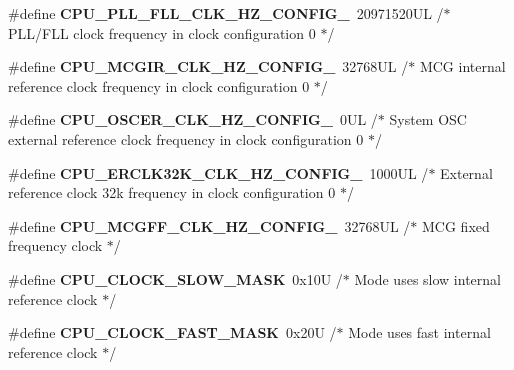 \begin{DoxyCompactItemize}
\item 
\#define {\bfseries C\+P\+U\+\_\+\+P\+L\+L\+\_\+\+F\+L\+L\+\_\+\+C\+L\+K\+\_\+\+H\+Z\+\_\+\+C\+O\+N\+F\+I\+G\+\_}~20971520\+U\+L /$\ast$ P\+L\+L/\+F\+L\+L clock frequency in clock configuration 0 $\ast$/\hypertarget{group___c_p_u___config__module_gad2aaa2918b640ae3833fc84e8f983c3c}{}\label{group___c_p_u___config__module_gad2aaa2918b640ae3833fc84e8f983c3c}

\item 
\#define {\bfseries C\+P\+U\+\_\+\+M\+C\+G\+I\+R\+\_\+\+C\+L\+K\+\_\+\+H\+Z\+\_\+\+C\+O\+N\+F\+I\+G\+\_}~32768\+U\+L /$\ast$ M\+C\+G internal reference clock frequency in clock configuration 0 $\ast$/\hypertarget{group___c_p_u___config__module_ga860e7441eac7d5e35385bcd62b019d9d}{}\label{group___c_p_u___config__module_ga860e7441eac7d5e35385bcd62b019d9d}

\item 
\#define {\bfseries C\+P\+U\+\_\+\+O\+S\+C\+E\+R\+\_\+\+C\+L\+K\+\_\+\+H\+Z\+\_\+\+C\+O\+N\+F\+I\+G\+\_}~0\+U\+L /$\ast$ System O\+S\+C external reference clock frequency in clock configuration 0 $\ast$/\hypertarget{group___c_p_u___config__module_ga2960ebfe6475f475999ea8f1d5448483}{}\label{group___c_p_u___config__module_ga2960ebfe6475f475999ea8f1d5448483}

\item 
\#define {\bfseries C\+P\+U\+\_\+\+E\+R\+C\+L\+K32\+K\+\_\+\+C\+L\+K\+\_\+\+H\+Z\+\_\+\+C\+O\+N\+F\+I\+G\+\_}~1000\+U\+L /$\ast$ External reference clock 32k frequency in clock configuration 0 $\ast$/\hypertarget{group___c_p_u___config__module_ga092702a75fd1041eb311850abb022240}{}\label{group___c_p_u___config__module_ga092702a75fd1041eb311850abb022240}

\item 
\#define {\bfseries C\+P\+U\+\_\+\+M\+C\+G\+F\+F\+\_\+\+C\+L\+K\+\_\+\+H\+Z\+\_\+\+C\+O\+N\+F\+I\+G\+\_}~32768\+U\+L /$\ast$ M\+C\+G fixed frequency clock $\ast$/\hypertarget{group___c_p_u___config__module_gafd8ec2ac4ea47574f95d0e5a6f80807e}{}\label{group___c_p_u___config__module_gafd8ec2ac4ea47574f95d0e5a6f80807e}

\item 
\#define {\bfseries C\+P\+U\+\_\+\+C\+L\+O\+C\+K\+\_\+\+S\+L\+O\+W\+\_\+\+M\+A\+SK}~0x10\+U     /$\ast$ Mode uses slow internal reference clock $\ast$/\hypertarget{group___c_p_u___config__module_ga73c89eb4c38748965ce261aefe20ff40}{}\label{group___c_p_u___config__module_ga73c89eb4c38748965ce261aefe20ff40}

\item 
\#define {\bfseries C\+P\+U\+\_\+\+C\+L\+O\+C\+K\+\_\+\+F\+A\+S\+T\+\_\+\+M\+A\+SK}~0x20\+U     /$\ast$ Mode uses fast internal reference clock $\ast$/\hypertarget{group___c_p_u___config__module_ga19352094544c5c927b80a6922a09bfe8}{}\label{group___c_p_u___config__module_ga19352094544c5c927b80a6922a09bfe8}


\end{DoxyCompactItemize}

